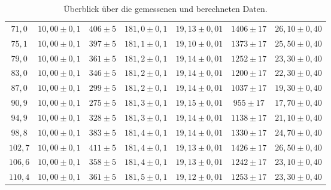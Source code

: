 \begin{table}
\begin{tabular}{ccccccc}
$71,0$ & $10,00 \pm 0,1$ & $406 \pm 5$ & $181,0 \pm 0,1$ & $19,13 \pm 0,01$ & $1406 \pm 17$  & $26,10 \pm 0,40$ \\

$75,1$ & $10,00 \pm 0,1$ & $397 \pm 5$ & $181,1 \pm 0,1$ & $19,10 \pm 0,01$ & $1373 \pm 17$  & $25,50 \pm 0,40$ \\

$79,0$ & $10,00 \pm 0,1$ & $361 \pm 5$ & $181,2 \pm 0,1$ & $19,14 \pm 0,01$ & $1252 \pm 17$  & $23,30 \pm 0,40$ \\

$83,0$ & $10,00 \pm 0,1$ & $346 \pm 5$ & $181,2 \pm 0,1$ & $19,14 \pm 0,01$ & $1200 \pm 17$  & $22,30 \pm 0,40$ \\

$87,0$ & $10,00 \pm 0,1$ & $299 \pm 5$ & $181,2 \pm 0,1$ & $19,14 \pm 0,01$ & $1037 \pm 17$  & $19,30 \pm 0,40$ \\

$90,9$ & $10,00 \pm 0,1$ & $275 \pm 5$ & $181,3 \pm 0,1$ & $19,15 \pm 0,01$ & $ 955 \pm 17$  & $17,70 \pm 0,40$ \\

$94,9$ & $10,00 \pm 0,1$ & $328 \pm 5$ & $181,3 \pm 0,1$ & $19,14 \pm 0,01$ & $1138 \pm 17$  & $21,10 \pm 0,40$ \\

$98,8$ & $10,00 \pm 0,1$ & $383 \pm 5$ & $181,4 \pm 0,1$ & $19,14 \pm 0,01$ & $1330 \pm 17$  & $24,70 \pm 0,40$ \\

$102,7$ & $10,00 \pm 0,1$ & $411 \pm 5$ & $181,4 \pm 0,1$ & $19,13 \pm 0,01$ & $1426 \pm 17$ & $26,50 \pm 0,40$ \\

$106,6$ & $10,00 \pm 0,1$ & $358 \pm 5$ & $181,4 \pm 0,1$ & $19,13 \pm 0,01$ & $1242 \pm 17$ & $23,10 \pm 0,40$ \\

$110,4$ & $10,00 \pm 0,1$ & $361 \pm 5$ & $181,5 \pm 0,1$ & $19,12 \pm 0,01$ & $1253 \pm 17$ & $23,30 \pm 0,40$ \\

\bottomrule
\end{tabular}

\caption{Überblick über die gemessenen und berechneten Daten.}
\label{tab:1}
\end{table}

